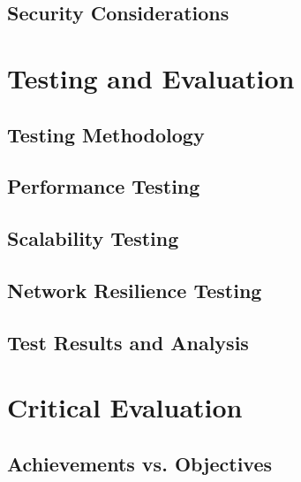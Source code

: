 \documentclass[12pt,a4paper]{report}
\begin{document}
\section{Security Considerations}

\chapter{Testing and Evaluation}
\section{Testing Methodology}

\section{Performance Testing}

\section{Scalability Testing}

\section{Network Resilience Testing}

\section{Test Results and Analysis}

\chapter{Critical Evaluation}
\section{Achievements vs. Objectives}
\end{document}
